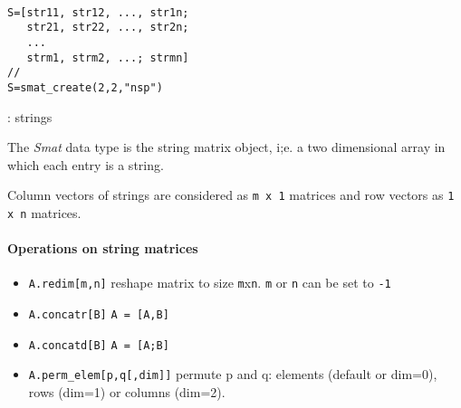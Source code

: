 
\begin{mandesc}
   \\
\end{mandesc}
\begin{calling_sequence}
\begin{verbatim}
S=[str11, str12, ..., str1n;
   str21, str22, ..., str2n;
   ...
   strm1, strm2, ...; strmn] 
// 
S=smat_create(2,2,"nsp")
\end{verbatim}
\end{calling_sequence}
\begin{parameters}
  \begin{varlist}
    : strings
  \end{varlist}
\end{parameters}

\begin{mandescription}
The \emph{Smat} data type is the string matrix  object, i;e. a
two dimensional array in which each entry is a string.

Column vectors of strings are considered as \verb!m x 1! matrices and row vectors
as \verb!1 x n! matrices.


\end{mandescription}

\paragraph{Operations on string matrices}
\begin{itemize}
\item \verb+A.redim[m,n]+ reshape matrix to size \verb+m+x\verb+n+. \verb+m+ or \verb+n+ can be set to \verb+-1+ 
\item \verb+A.concatr[B]+ \verb+A = [A,B]+
\item \verb+A.concatd[B]+ \verb+A = [A;B]+
\item \verb+A.perm_elem[p,q[,dim]]+ permute p and q: elements
  (default or dim=0), rows (dim=1) or columns (dim=2).
\end{itemize}

